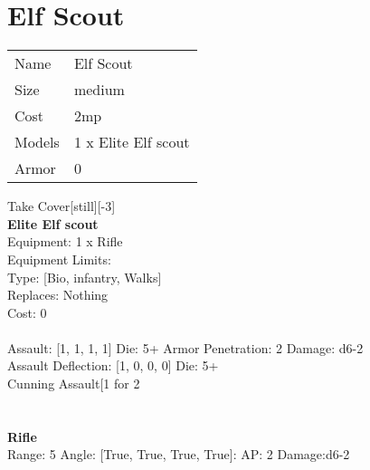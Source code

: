 \pagebreak\pagebreak

\section{ Elf Scout }

\begin{tabular}{ll}
  Name & Elf Scout \\
  Size & medium\\
  Cost & 2mp\\
  Models & 1 x Elite Elf scout\\
  Armor & 0\\
\end{tabular}

\noindent Take Cover[still][-3]\\ 


{\bf Elite Elf scout } \\
Equipment: 1 x Rifle \\
Equipment Limits:  \\
Type: [Bio, infantry, Walks] \\
Replaces: Nothing \\
Cost: 0\\
\ \\
Assault: [1, 1, 1, 1] Die: 5+ Armor Penetration: 2 Damage: d6-2 \\
Assault Deflection: [1, 0, 0, 0] Die: 5+\\
\indent Cunning Assault[1 for 2\\ 
 
\ \\

\ \\
{\bf Rifle } \\



Range: 5  Angle: [True, True, True, True]: AP: 2 Damage:d6-2 \\




 
\ \\



